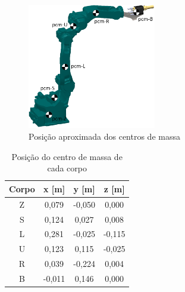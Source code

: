 \begin{figure}[h]
	\centering 
 	\includegraphics[width=0.5\textwidth]{figs/pcm_mh12}
 	\caption{Posição aproximada dos centros de massa}
 	\label{fig::pcm_mh12}
\end{figure}

%
\begin{table}[h] \centering
\caption{Posição do centro de massa de cada corpo}
\label{tab::resumo_cm}
\begin{tabular}{@{}cccc@{}}
\toprule
\textbf{Corpo} & \textbf{x [m]} & \textbf{y [m]} & \textbf{z [m]} \\ \midrule
Z              & 0,079      & -0,050     & 0,000      \\
S              & 0,124      & 0,027      & 0,008      \\
L              & 0,281      & -0,025     & -0,115     \\
U              & 0,123      & 0,115      & -0,025     \\
R              & 0,039      & -0,224     & 0,004      \\
B              & -0,011     & 0,146      & 0,000      \\ \bottomrule
\end{tabular}
\end{table}
%

